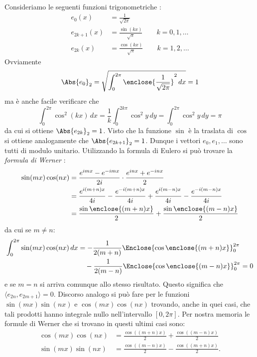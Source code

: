 Consideriamo le seguenti funzioni trigonometriche%
%
:
\begin{equation}\label{eq:54741346}
\begin{aligned}
  e_0 (x) &= \frac{1}{\sqrt{2\pi}} \\
  e_{2k+1}(x) &= \frac{\sin(kx)}{\sqrt{\pi}} \qquad k=0,1,\dots\\
  e_{2k}(x) &= \frac{\cos(kx)}{\sqrt{\pi}} \qquad k=1,2,\dots
\end{aligned}
\end{equation}
Ovviamente
\[
  \Abs{e_0}_2=\sqrt{\int_{0}^{2\pi} \enclose{\frac{1}{\sqrt{2\pi}}}^2\, dx} = 1
\]
ma è anche facile verificare che
\[
  \int_{0}^{2\pi} \cos^2 (kx)\, dx
  = \frac{1}{k}\int_{0}^{2k\pi} \cos^2 y\, dy
  = \int_{0}^{2\pi} \cos^2 y\, dy = \pi
\]
da cui si ottiene $\Abs{e_{2k}}_2 = 1$.
Visto che la funzione $\sin$ è la traslata di $\cos$ si
ottiene analogamente che $\Abs{e_{2k+1}}_2=1$.
Dunque i vettori $e_0,e_1,\dots$ sono tutti di modulo unitario.
Utilizzando la formula di Eulero
si può trovare la \emph{formula di Werner}%
:
%
%
\begin{align*}
 \sin(mx)\cos(nx)
 &= \frac{e^{imx}-e^{-imx}}{2i}\cdot \frac{e^{inx}+e^{-inx}}{2}\\
 &= \frac{e^{i(m+n)x}}{4i} - \frac{e^{-i(m+n)x}}{4i} 
  + \frac{e^{i(m-n)x}}{4i} - \frac{e^{-i(m-n)x}}{4i}\\
 &= \frac{\sin\enclose{(m+n)x}}{2} + \frac{\sin\enclose{(m-n)x}}{2}
\end{align*}
da cui se $m\neq n$:
\begin{align*}
 \int_{0}^{2\pi} \sin(mx)\cos(nx)\, dx &=
 -\frac 1 {2(m+n)} \Enclose{\cos\enclose{(m+n)x}}_{0}^{2\pi} \\
  &\quad - \frac{1}{2(m-n)}\Enclose{\cos\enclose{(m-n)x}}_{0}^{2\pi} = 0
\end{align*}
e se $m=n$ si arriva comunque allo stesso risultato.
Questo significa che $\langle e_{2n},e_{2m+1}\rangle = 0$.
Discorso analogo si può fare per le funzioni $\sin(mx)\sin(nx)$ e $\cos(mx)\cos(nx)$
trovando, anche in quei casi, che tali prodotti hanno integrale nullo
nell'intervallo $[0,2\pi]$.
Per nostra memoria le formule di Werner che si trovano
in questi ultimi casi sono:
%
%
%
%
\begin{align*}
  \cos(mx) \cos(nx) &=  \frac{\cos((m+n)x)}{2} + \frac{\cos((m-n)x)}{2}\\
  \sin(mx) \sin(nx) &=  \frac{\cos((m-n)x)}{2} - \frac{\cos((m+n)x)}{2}.
\end{align*}

